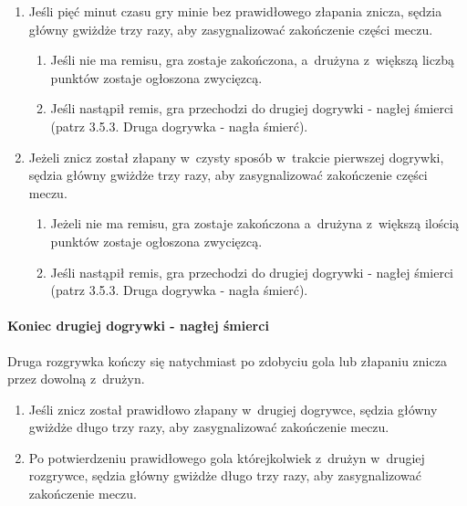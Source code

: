 \documentclass[12pt]{article}
\begin{document}
\begin{enumerate}
	\item Jeśli pięć minut czasu gry minie bez prawidłowego złapania znicza,
	      sędzia główny gwiżdże trzy razy, aby zasygnalizować zakończenie części
	      meczu.
	      \begin{enumerate}
		      \item Jeśli nie ma remisu, gra zostaje zakończona, a~drużyna z~większą
		            liczbą punktów zostaje ogłoszona zwycięzcą.

		      \item Jeśli nastąpił remis, gra przechodzi do drugiej dogrywki - nagłej
		            śmierci (patrz 3.5.3. Druga dogrywka - nagła śmierć).
	      \end{enumerate}

	\item Jeżeli znicz został złapany w~czysty sposób w~trakcie pierwszej
	      dogrywki, sędzia główny gwiżdże trzy razy, aby zasygnalizować
	      zakończenie części meczu.
	      \begin{enumerate}
		      \item Jeżeli nie ma remisu, gra zostaje zakończona a~drużyna z~większą
		            ilością punktów zostaje
		            ogłoszona zwycięzcą.

		      \item Jeśli nastąpił remis, gra przechodzi do drugiej dogrywki - nagłej
		            śmierci (patrz 3.5.3. Druga dogrywka - nagła śmierć).
	      \end{enumerate}
\end{enumerate}

\paragraph{Koniec drugiej dogrywki - nagłej śmierci}
Druga
rozgrywka kończy się natychmiast po zdobyciu gola lub złapaniu znicza
przez dowolną z~drużyn.

\begin{enumerate}
	\item Jeśli znicz został prawidłowo złapany w~drugiej dogrywce, sędzia
	      główny gwiżdże długo trzy razy, aby zasygnalizować zakończenie meczu.

	\item Po potwierdzeniu prawidłowego gola którejkolwiek z~drużyn w~drugiej
	      rozgrywce, sędzia główny gwiżdże długo trzy razy, aby zasygnalizować
	      zakończenie meczu.
\end{enumerate}
\end{document}
